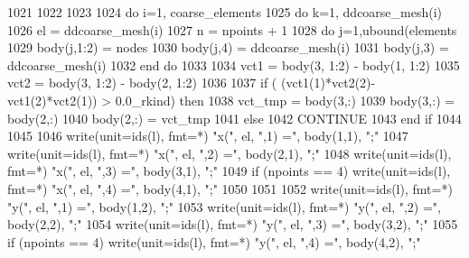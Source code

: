 \begin{DoxyCode}
1021     
1022 
1023  
1024         \textcolor{keywordflow}{do} i=1, coarse_elements%
1025           \textcolor{keywordflow}{do} k=1, ddcoarse_mesh(i)%
1026             el = ddcoarse_mesh(i)%
1027             n = npoints + 1
1028             \textcolor{keywordflow}{do} j=1,ubound(elements%
1029               body(j,1:2) = nodes%
1030               body(j,4) = ddcoarse_mesh(i)%
1031               body(j,3) = ddcoarse_mesh(i)%
1032 \textcolor{keywordflow}{            end do}
1033             
1034             vct1 = body(3, 1:2) - body(1, 1:2) 
1035             vct2 = body(3, 1:2) - body(2, 1:2)
1036             
1037             \textcolor{keywordflow}{if} ( (vct1(1)*vct2(2)-vct1(2)*vct2(1)) > 0.0\_rkind) \textcolor{keywordflow}{then}
1038               vct\_tmp = body(3,:)
1039               body(3,:) = body(2,:)
1040               body(2,:) = vct\_tmp
1041             \textcolor{keywordflow}{else}
1042               \textcolor{keywordflow}{CONTINUE}
1043 \textcolor{keywordflow}{            end if}
1044 
1045 
1046             \textcolor{keyword}{write}(unit=ids(l), fmt=*) \textcolor{stringliteral}{"x("}, el, \textcolor{stringliteral}{",1) ="}, body(1,1), \textcolor{stringliteral}{";"}
1047             \textcolor{keyword}{write}(unit=ids(l), fmt=*) \textcolor{stringliteral}{"x("}, el, \textcolor{stringliteral}{",2) ="}, body(2,1), \textcolor{stringliteral}{";"}
1048             \textcolor{keyword}{write}(unit=ids(l), fmt=*) \textcolor{stringliteral}{"x("}, el, \textcolor{stringliteral}{",3) ="}, body(3,1), \textcolor{stringliteral}{";"}
1049             \textcolor{keywordflow}{if} (npoints == 4) \textcolor{keyword}{write}(unit=ids(l), fmt=*) \textcolor{stringliteral}{"x("}, el, \textcolor{stringliteral}{",4) ="}\textcolor{comment}{, body(4,1), }\textcolor{stringliteral}{";"}
1050 
1051 
1052             \textcolor{keyword}{write}(unit=ids(l), fmt=*) \textcolor{stringliteral}{"y("}, el, \textcolor{stringliteral}{",1) ="}, body(1,2), \textcolor{stringliteral}{";"}
1053             \textcolor{keyword}{write}(unit=ids(l), fmt=*) \textcolor{stringliteral}{"y("}, el, \textcolor{stringliteral}{",2) ="}, body(2,2), \textcolor{stringliteral}{";"}
1054             \textcolor{keyword}{write}(unit=ids(l), fmt=*) \textcolor{stringliteral}{"y("}, el, \textcolor{stringliteral}{",3) ="}, body(3,2), \textcolor{stringliteral}{";"}
1055             \textcolor{keywordflow}{if} (npoints == 4) \textcolor{keyword}{write}(unit=ids(l), fmt=*) \textcolor{stringliteral}{"y("}, el, \textcolor{stringliteral}{",4) ="}\textcolor{comment}{, body(4,2), }\textcolor{stringliteral}{";"}

\end{DoxyCode}
